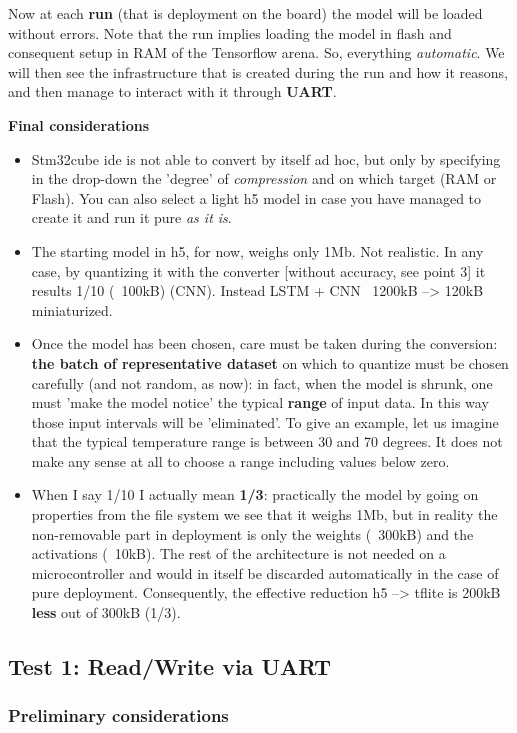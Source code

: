 Now at each \textbf{run} (that is deployment on the board) the model will be loaded without errors. Note that the run implies loading the model in flash and consequent setup in RAM of the Tensorflow arena. So, everything \textit{automatic}. We will then see the infrastructure that is created during the run and how it reasons, and then manage to interact with it through \textbf{UART}.

\textbf{Final considerations}
\begin{itemize}
    \item Stm32cube ide is not able to convert by itself ad hoc, but only by specifying in the drop-down the 'degree' of \textit{compression} and on which target (RAM or Flash). You can also select a light h5 model in case you have managed to create it and run it pure \textit{as it is}.  
    \item The starting model in h5, for now, weighs only 1Mb. Not realistic. In any case, by quantizing it with the converter [without accuracy, see point 3] it results 1/10 (~100kB) (CNN). Instead LSTM + CNN ~1200kB --> 120kB miniaturized. 
    \item Once the model has been chosen, care must be taken during the conversion: \textbf{the batch of representative dataset} on which to quantize must be chosen carefully (and not random, as now): in fact, when the model is shrunk, one must 'make the model notice' the typical \textbf{range} of input data. In this way those input intervals will be 'eliminated'. To give an example, let us imagine that the typical temperature range is between 30 and 70 degrees. It does not make any sense at all to choose a range including values below zero.
    \item When I say 1/10 I actually mean \textbf{1/3}: practically the model by going on properties from the file system we see that it weighs 1Mb, but in reality the non-removable part in deployment is only the weights (~300kB) and the activations (~10kB). The rest of the architecture is not needed on a microcontroller and would in itself be discarded automatically in the case of pure deployment. Consequently, the effective reduction h5 --> tflite is 200kB \textbf{less} out of 300kB (1/3). 
\end{itemize}

\subsection{Test 1: Read/Write via UART}

\subsubsection{Preliminary considerations}

